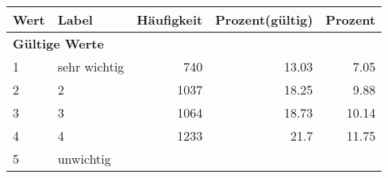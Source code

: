      \begin{longtable}{lXrrr}
     \toprule
     \textbf{Wert} & \textbf{Label} & \textbf{Häufigkeit} & \textbf{Prozent(gültig)} & \textbf{Prozent} \\
     \endhead
     \midrule
     \multicolumn{5}{l}{\textbf{Gültige Werte}}\\

     1 &
     \multicolumn{1}{X}{ sehr wichtig   } &


       \num{740} &
       \num[round-mode=places,round-precision=2]{13,03} &
         \num[round-mode=places,round-precision=2]{7,05} \\

     2 &
     \multicolumn{1}{X}{ 2   } &


       \num{1037} &
       \num[round-mode=places,round-precision=2]{18,25} &
         \num[round-mode=places,round-precision=2]{9,88} \\

     3 &
     \multicolumn{1}{X}{ 3   } &


       \num{1064} &
       \num[round-mode=places,round-precision=2]{18,73} &
         \num[round-mode=places,round-precision=2]{10,14} \\

     4 &
     \multicolumn{1}{X}{ 4   } &


       \num{1233} &
       \num[round-mode=places,round-precision=2]{21,7} &
         \num[round-mode=places,round-precision=2]{11,75} \\

     5 &
     \multicolumn{1}{X}{ unwichtig   } &



\end{longtable}
